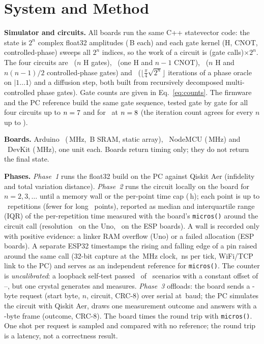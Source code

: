 \section{System and Method}\label{sec:method}
\textbf{Simulator and circuits.} All boards run the same C++ statevector code: the state is $2^n$ complex float32 amplitudes (\AmpBytes\,B each) and each gate kernel (H, CNOT, controlled-phase) sweeps all $2^n$ indices, so the work of a circuit is (gate calls)$\times 2^n$. The four circuits are \hall\ ($n$ H gates), \bell\ (one H and $n{-}1$ CNOT), \qft\ ($n$ H and $n(n{-}1)/2$ controlled-phase gates) and \grover\ ($\lfloor\frac{\pi}{4}\sqrt{2^n}\rfloor$ iterations of a phase oracle on $|1\ldots1\rangle$ and a diffusion step, both built from recursively decomposed multi-controlled phase gates). Gate counts are given in Eq.~\eqref{eq:counts}. The firmware and the PC reference build the same gate sequence, tested gate by gate for all four circuits up to $n=7$ and for \grover\ at $n=8$ (the iteration count agrees for every $n$ up to \KMaxN).

\textbf{Boards.} Arduino \uno\ (\FcpuUno\,MHz, \MemSramUno\,B SRAM, static array), \espA\ NodeMCU (\FcpuEspLo\,MHz) and \espB\ DevKit (\FcpuEspHi\,MHz), one unit each. Boards return timing only; they do not return the final state.

\textbf{Phases.} \emph{Phase~1} runs the float32 build on the PC against Qiskit Aer (infidelity and total variation distance). \emph{Phase~2} runs the circuit locally on the board for $n=2,3,\ldots$ until a memory wall or the per-point time cap (\PointCapH\,h); each point is up to \Reps\ repetitions (fewer for long \grover\ points), reported as median and interquartile range (IQR) of the per-repetition time measured with the board's \texttt{micros()} around the circuit call (resolution \UnoResUs\us\ on the Uno, \EspResUs\us\ on the ESP boards). A wall is recorded only with positive evidence: a linker RAM overflow (Uno) or a failed allocation (ESP boards). A separate ESP32 timestamps the rising and falling edge of a pin raised around the same call (32-bit capture at the \ApbMHz\,MHz clock, \CounterTickNs\,ns per tick, WiFi/TCP link to the PC) and serves as an independent reference for \texttt{micros()}. The counter is \emph{uncalibrated}: a loopback self-test passed \SelfTestPass\ of \SelfTestAll\ scenarios with a constant offset of \SelfTestLo--\SelfTestHi\us, but one crystal generates and measures. \emph{Phase~3} offloads: the board sends a \ReqBytes-byte request (start byte, $n$, circuit, CRC-8) over serial at \BaudSp\,baud; the PC simulates the circuit with Qiskit Aer, draws one measurement outcome and answers with a \RespBytes-byte frame (outcome, CRC-8). The board times the round trip with \texttt{micros()}. One shot per request is sampled and compared with no reference; the round trip is a latency, not a correctness result.

